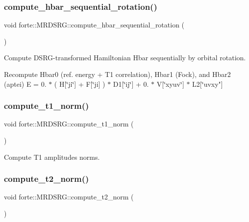 \subsubsection{\texorpdfstring{compute\+\_\+hbar\+\_\+sequential\+\_\+rotation()}{compute\_hbar\_sequential\_rotation()}}
{\footnotesize\ttfamily void forte\+::\+M\+R\+D\+S\+R\+G\+::compute\+\_\+hbar\+\_\+sequential\+\_\+rotation (\begin{DoxyParamCaption}{ }\end{DoxyParamCaption})\hspace{0.3cm}{\ttfamily [protected]}}



Compute D\+S\+R\+G-\/transformed Hamiltonian Hbar sequentially by orbital rotation. 

Recompute Hbar0 (ref. energy + T1 correlation), Hbar1 (Fock), and Hbar2 (aptei) E = 0. $\ast$ ( H\mbox{[}\char`\"{}ji\char`\"{}\mbox{]} + F\mbox{[}\char`\"{}ji\mbox{]} ) $\ast$ D1\mbox{[}\char`\"{}ij\char`\"{}\mbox{]} + 0. $\ast$ V\mbox{[}\char`\"{}xyuv\char`\"{}\mbox{]} $\ast$ L2\mbox{[}\char`\"{}uvxy"\mbox{]} \mbox{\label{classforte_1_1_m_r_d_s_r_g_aa919101d0d5c5d46f3e3fa143a4aeef8}} 
\subsubsection{\texorpdfstring{compute\+\_\+t1\+\_\+norm()}{compute\_t1\_norm()}}
{\footnotesize\ttfamily void forte\+::\+M\+R\+D\+S\+R\+G\+::compute\+\_\+t1\+\_\+norm (\begin{DoxyParamCaption}{ }\end{DoxyParamCaption})\hspace{0.3cm}{\ttfamily [protected]}}



Compute T1 amplitudes norms. 

\mbox{\label{classforte_1_1_m_r_d_s_r_g_a58bf6c2c7eff247c638b2bc6b5aaa784}} 
\subsubsection{\texorpdfstring{compute\+\_\+t2\+\_\+norm()}{compute\_t2\_norm()}}
{\footnotesize\ttfamily void forte\+::\+M\+R\+D\+S\+R\+G\+::compute\+\_\+t2\+\_\+norm (\begin{DoxyParamCaption}{ }\end{DoxyParamCaption})\hspace{0.3cm}{\ttfamily [protected]}}



